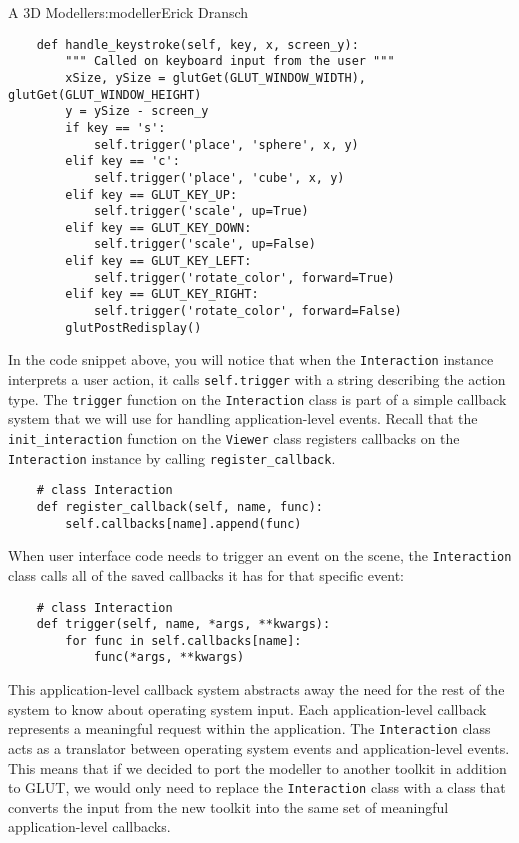 \begin{aosachapter}{A 3D Modeller}{s:modeller}{Erick Dransch}
\begin{verbatim}
    def handle_keystroke(self, key, x, screen_y):
        """ Called on keyboard input from the user """
        xSize, ySize = glutGet(GLUT_WINDOW_WIDTH), glutGet(GLUT_WINDOW_HEIGHT)
        y = ySize - screen_y
        if key == 's':
            self.trigger('place', 'sphere', x, y)
        elif key == 'c':
            self.trigger('place', 'cube', x, y)
        elif key == GLUT_KEY_UP:
            self.trigger('scale', up=True)
        elif key == GLUT_KEY_DOWN:
            self.trigger('scale', up=False)
        elif key == GLUT_KEY_LEFT:
            self.trigger('rotate_color', forward=True)
        elif key == GLUT_KEY_RIGHT:
            self.trigger('rotate_color', forward=False)
        glutPostRedisplay()
\end{verbatim}

\label{internal-callbacks}

In the code snippet above, you will notice that when the
\texttt{Interaction} instance interprets a user action, it calls
\texttt{self.trigger} with a string describing the action type. The
\texttt{trigger} function on the \texttt{Interaction} class is part of a
simple callback system that we will use for handling application-level
events. Recall that the \texttt{init\_interaction} function on the
\texttt{Viewer} class registers callbacks on the \texttt{Interaction}
instance by calling \texttt{register\_callback}.

\begin{verbatim}
    # class Interaction
    def register_callback(self, name, func):
        self.callbacks[name].append(func)
\end{verbatim}

When user interface code needs to trigger an event on the scene, the
\texttt{Interaction} class calls all of the saved callbacks it has for
that specific event:

\begin{verbatim}
    # class Interaction
    def trigger(self, name, *args, **kwargs):
        for func in self.callbacks[name]:
            func(*args, **kwargs)
\end{verbatim}

This application-level callback system abstracts away the need for the
rest of the system to know about operating system input. Each
application-level callback represents a meaningful request within the
application. The \texttt{Interaction} class acts as a translator between
operating system events and application-level events. This means that if
we decided to port the modeller to another toolkit in addition to GLUT,
we would only need to replace the \texttt{Interaction} class with a
class that converts the input from the new toolkit into the same set of
meaningful application-level callbacks.


\end{aosachapter}
